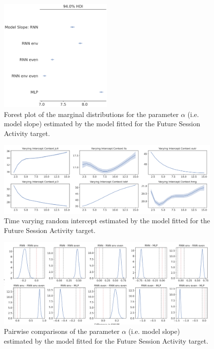 \begin{figure}[H]
\centering
\includegraphics[width=0.5\textwidth]{images/appendix_C/Future Session Activity_models_3.png}
\caption[\textbf{Future session activity model fixed effect}]{Forest plot of the marginal distributions for the parameter $\alpha$ (i.e. model slope) estimated by the model fitted for the Future Session Activity target.}
\label{model_acti_3}
\end{figure}

\begin{figure}[H]
\centering
\includegraphics[width=\textwidth]{images/appendix_C/Future Session Activity_interc_3.png}
\caption[\textbf{Future session activity time-varying random intercept}]{Time varying random intercept estimated by the model fitted for the Future Session Activity target.}
\label{interc_acti_3}
\end{figure}

\begin{figure}[H]
\centering
\includegraphics[width=\textwidth]{images/appendix_C/Future_Session_Activity_comp_3.png}
\caption[\textbf{Future session activity pairwise comparisons of model fixed effect}]{Pairwise comparisons of the parameter $\alpha$ (i.e. model slope) estimated by the model fitted for the Future Session Activity target.}
\label{comp_acti_3}
\end{figure}

